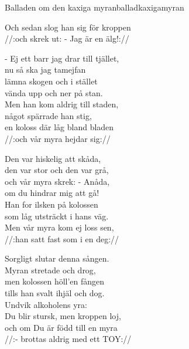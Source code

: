 \begin{song}{Balladen om den kaxiga myran}{balladkaxigamyran}
\begin{vers}
Och sedan slog han sig för kroppen\\
//:och skrek ut: - Jag är en älg!://\\
\end{vers}
\begin{vers}
- Ej ett barr jag drar till tjället,\\
nu så ska jag tamejfan\\
lämna skogen och i stället\\
vända upp och ner på stan.\\
Men han kom aldrig till staden,\\
något spärrade han stig,\\
en koloss där låg bland bladen\\
//:och vår myra hejdar sig://\\
\end{vers}
\begin{vers}
Den var hiskelig att skåda,\\
den var stor och den var grå,\\
och vår myra skrek: - Anåda,\\
om du hindrar mig att gå!\\
Han for ilsken på kolossen\\
som låg utsträckt i hans väg.\\
Men vår myra kom ej loss sen,\\
//:han satt fast som i en deg://\\
\end{vers}

\newp

\begin{vers}
Sorgligt slutar denna sången.\\
Myran stretade och drog,\\
men kolossen höll'en fången\\
tills han svalt ihjäl och dog.\\
Undvik alkoholens yra:\\
Du blir stursk, men kroppen loj,\\
och om Du är född till en myra\\
//:- brottas aldrig med ett TOY://\\
\end{vers}
\end{song}

